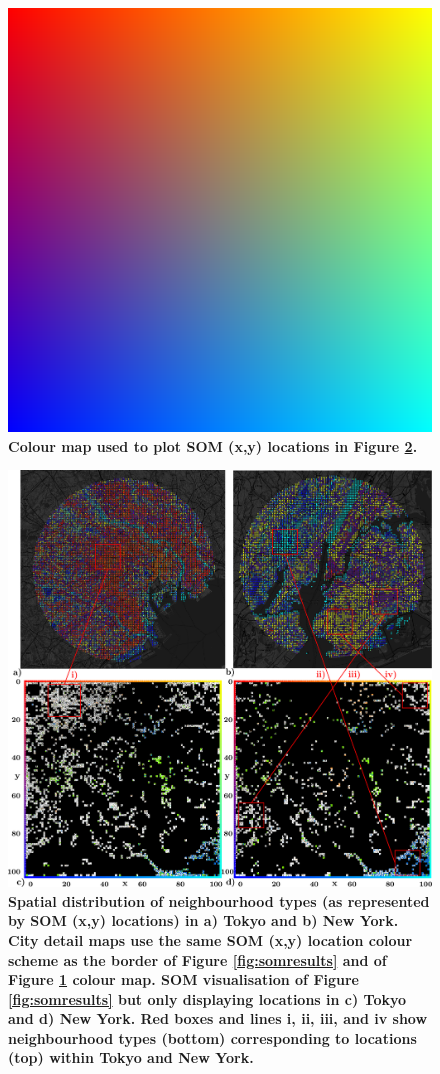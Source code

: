 \documentclass[9pt,twocolumn,twoside,lineno]{pnas-new}
\begin{document}
\begin{figure}
\centering
\includegraphics[trim={0 0 0 0},clip,scale=0.09]{cubediagonal.png}
\caption{\bf Colour map used to plot SOM (x,y) locations in Figure \ref{fig:citylocations}. }
 \label{fig:colormap}
\end{figure} 

\begin{figure}
\centering
\includegraphics[width=.55\linewidth]{BlockTypologies_Figures5.png}
\caption{\bf Spatial distribution of neighbourhood types (as represented by SOM (x,y) locations) in a) Tokyo and b) New York. City detail maps use the same SOM (x,y) location colour scheme as the border of Figure \ref{fig:somresults} and of Figure \ref{fig:colormap} colour map. SOM visualisation of Figure \ref{fig:somresults} but only displaying locations in c) Tokyo and d) New York. Red boxes and lines i, ii, iii, and iv show neighbourhood types (bottom) corresponding to locations (top) within Tokyo and New York.}
 \label{fig:citylocations}
\end{figure} 
\end{document}
